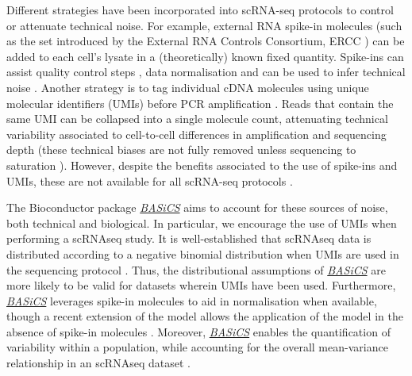\documentclass[9pt,a4paper,]{extarticle}
\begin{document}
Different strategies have been incorporated into scRNA-seq protocols to control
or attenuate technical noise.
For example, external RNA spike-in molecules (such as the set introduced by the
External RNA Controls Consortium, ERCC \citep{Rna2005}) can be added to each cell's
lysate in a (theoretically) known fixed quantity.
Spike-ins can assist quality control steps \citep{McCarthy2017}, data normalisation
\citep{Vallejos2017} and can be used to infer technical noise \citep{Brennecke2013}.
Another strategy is to tag individual cDNA molecules using unique molecular
identifiers (UMIs) before PCR amplification \citep{Islam2014}.
Reads that contain the same UMI can be collapsed into a single molecule count,
attenuating technical variability associated to cell-to-cell differences
in amplification and sequencing depth (these technical biases are not fully
removed unless sequencing to saturation \citep{Vallejos2017}).
However, despite the benefits associated to the use of spike-ins and UMIs,
these are not available for all scRNA-seq protocols \citep{Haque2017}.

The Bioconductor package \emph{\href{https://bioconductor.org/packages/3.11/BASiCS}{BASiCS}} aims to account for these
sources of noise, both technical and biological. In particular, we
encourage the use of UMIs when performing a scRNAseq study.
It is well-established that scRNAseq data is distributed
according to a negative binomial distribution when UMIs are used in the
sequencing protocol \citep{Svennson2020, Townes2020, Townes2019}. Thus, the
distributional assumptions of \emph{\href{https://bioconductor.org/packages/3.11/BASiCS}{BASiCS}} are more likely to be valid
for datasets wherein UMIs have been used. Furthermore,
\emph{\href{https://bioconductor.org/packages/3.11/BASiCS}{BASiCS}} leverages spike-in molecules to aid in normalisation when
available, though a recent extension of the model allows the application of
the model in the absence of spike-in molecules \citep{Eling2018}. Moreover,
\emph{\href{https://bioconductor.org/packages/3.11/BASiCS}{BASiCS}} enables the quantification of variability within a
population, while accounting for the overall mean-variance relationship in
an scRNAseq dataset \citep{Eling2018}.
\end{document}

